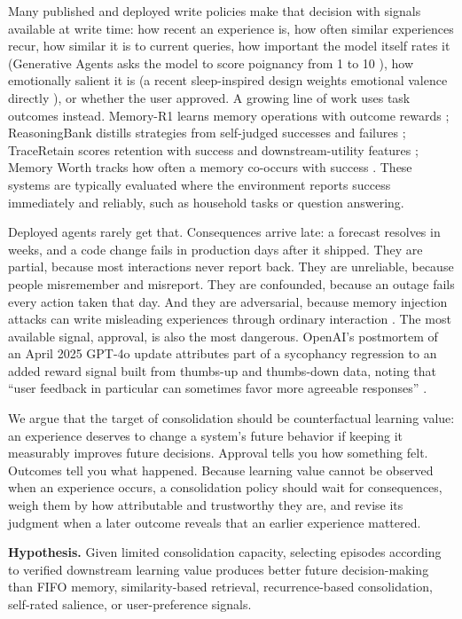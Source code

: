 \documentclass[11pt]{article}
\begin{document}
Many published and deployed write policies make that decision with signals available at write time: how recent an experience is, how often similar experiences recur, how similar it is to current queries, how important the model itself rates it (Generative Agents asks the model to score poignancy from 1 to 10 \citep{park2023}), how emotionally salient it is (a recent sleep-inspired design weights emotional valence directly \citep{shinde2026scm}), or whether the user approved. A growing line of work uses task outcomes instead. Memory-R1 learns memory operations with outcome rewards \citep{yan2025memoryr1}; ReasoningBank distills strategies from self-judged successes and failures \citep{ouyang2025reasoningbank}; TraceRetain scores retention with success and downstream-utility features \citep{reddy2026traceretain}; Memory Worth tracks how often a memory co-occurs with success \citep{simsek2026worth}. These systems are typically evaluated where the environment reports success immediately and reliably, such as household tasks or question answering.

Deployed agents rarely get that. Consequences arrive late: a forecast resolves in weeks, and a code change fails in production days after it shipped. They are partial, because most interactions never report back. They are unreliable, because people misremember and misreport. They are confounded, because an outage fails every action taken that day. And they are adversarial, because memory injection attacks can write misleading experiences through ordinary interaction \citep{dong2025minja,chen2024agentpoison}. The most available signal, approval, is also the most dangerous. OpenAI's postmortem of an April 2025 GPT-4o update attributes part of a sycophancy regression to an added reward signal built from thumbs-up and thumbs-down data, noting that ``user feedback in particular can sometimes favor more agreeable responses'' \citep{openai2025sycophancy}.

We argue that the target of consolidation should be counterfactual learning value: an experience deserves to change a system's future behavior if keeping it measurably improves future decisions. Approval tells you how something felt. Outcomes tell you what happened. Because learning value cannot be observed when an experience occurs, a consolidation policy should wait for consequences, weigh them by how attributable and trustworthy they are, and revise its judgment when a later outcome reveals that an earlier experience mattered.

\begin{tcolorbox}[colback=wash,colframe=wash,boxrule=0pt,left=6pt,right=6pt,top=4pt,bottom=4pt]
\textbf{Hypothesis.} Given limited consolidation capacity, selecting episodes according to verified downstream learning value produces better future decision-making than FIFO memory, similarity-based retrieval, recurrence-based consolidation, self-rated salience, or user-preference signals.
\end{tcolorbox}
\end{document}
